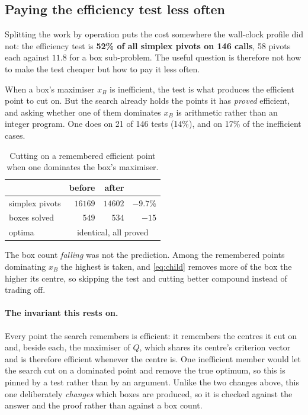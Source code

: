 \documentclass[11pt,a4paper]{article}
\begin{document}
\subsection{Paying the efficiency test less often}
\label{sec:known}

Splitting the work by operation puts the cost somewhere the wall-clock profile
did not: the efficiency test is \textbf{52\% of all simplex pivots on 146
calls}, 58 pivots each against $11.8$ for a box sub-problem. The useful
question is therefore not how to make the test cheaper but how to pay it less
often.

When a box's maximiser $x_B$ is inefficient, the test is what produces the
efficient point to cut on. But the search already holds the points it has
\emph{proved} efficient, and asking whether one of them dominates $x_B$ is
arithmetic rather than an integer program. One does on 21 of 146 tests
(14\%), and on 17\% of the inefficient cases.

\begin{table}[h]
\centering
\caption{Cutting on a remembered efficient point when one dominates the box's
maximiser.}
\begin{tabular}{lrrr}
\toprule
 & before & after & \\
\midrule
simplex pivots  & $16169$ & $14602$ & $-9.7\%$ \\
boxes solved    & $549$   & $534$   & $-15$ \\
optima          & \multicolumn{3}{c}{identical, all proved} \\
\bottomrule
\end{tabular}
\end{table}

\noindent
The box count \emph{falling} was not the prediction. Among the remembered
points dominating $x_B$ the highest is taken, and \eqref{eq:child} removes more
of the box the higher its centre, so skipping the test and cutting better
compound instead of trading off.

\paragraph{The invariant this rests on.} Every point the search remembers is
efficient: it remembers the centres it cut on and, beside each, the maximiser
of $Q$, which shares its centre's criterion vector and is therefore efficient
whenever the centre is. One inefficient member would let the search cut on a
dominated point and remove the true optimum, so this is pinned by a test rather
than by an argument. Unlike the two changes above, this one deliberately
\emph{changes} which boxes are produced, so it is checked against the answer
and the proof rather than against a box count.
\end{document}

